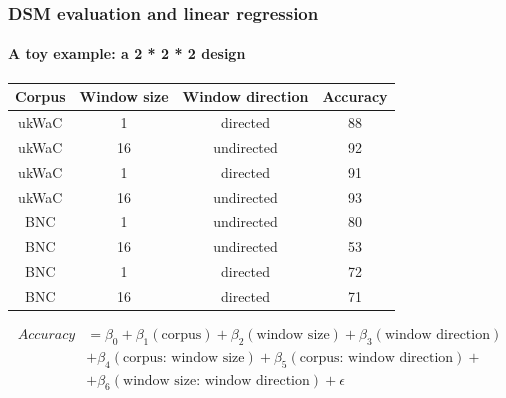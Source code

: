 \documentclass[t]{beamer} %
\begin{document}
\begin{frame}
  \frametitle{DSM evaluation and linear regression}
  \framesubtitle{A toy example: a 2 * 2 * 2 design}
  \centering
  \footnotesize
  \begin{tabular}{cccc}
    \hline
    Corpus & Window size &  Window direction &  Accuracy  \\  
    \hline 
    ukWaC & 1 & directed  &  88  \\  
    ukWaC & 16 & undirected   & 92 \\
    ukWaC & 1 & directed  &  91  \\  
    ukWaC & 16 & undirected   & 93 \\    
    BNC & 1  & undirected  &  80  \\  
    BNC & 16  & undirected  & 53   \\ 
    BNC & 1  & directed  &  72  \\  
    BNC & 16  & directed  & 71 \\   
    \hline
  \end{tabular}

  \begin{block}{}\small\ungap[2]
    \begin{align*}
      Accuracy &= \beta_{0} + \beta_1(\text{corpus})  + \beta_2(\text{window size}) +  \beta_3(\text{window direction}) \\
      & + \beta_4(\text{corpus: window size}) + \beta_5(\text{corpus: window direction}) + \\
      & + \beta_6(\text{window size: window direction})  + \epsilon
    \end{align*}
    \ungap[1.5]
  \end{block}

\end{frame}
\end{document}
